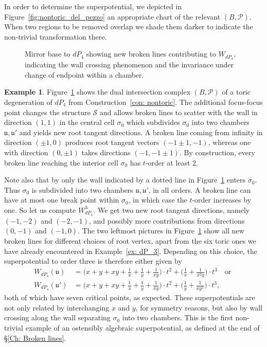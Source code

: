 \documentclass[11pt,letter]{amsart}
\theoremstyle{definition}
\newtheorem{example}[theorem]{Example}
\theoremstyle{remark}
\numberwithin{equation}{section}
\numberwithin{figure}{section}
\newcommand {\fou}  {\mathfrak{u}}
\renewcommand{\P}  {\mathscr{P}}
\newcommand {\scrS}  {\mathscr{S}}
\begin{document}
In order to determine the superpotential, we depicted in
Figure~\ref{fig:nontoric_del_pezzo} an appropriate chart of the relevant
$(B,\P)$. When two regions to be removed overlap we shade them darker to
indicate the non-trivial transformation there.

\begin{figure}

\caption{Mirror base to $dP_4$ showing new broken lines contributing
to $W_{dP_4}$, indicating the wall crossing phenomenon and
the invariance under change of endpoint within a chamber.}
\label{fig:higher_dp4}
\end{figure}

\begin{example}
\label{ex: dP4}
Figure~\ref{fig:higher_dp4} shows the dual intersection complex $(B,\P)$ of a
toric degeneration of $dP_4$ from Construction~\ref{con: nontoric}. The
additional focus-focus point changes the structure $\scrS$ and allows broken
lines to scatter with the wall in direction $(1,1)$ in the central cell
$\sigma_0$ which subdivides $\sigma_0$ into two chambers $\fou,\fou'$ and
yields new root tangent directions. A broken line coming from infinity in
direction $(\pm 1,0)$ produces root tangent vectors $(-1\pm 1,-1)$, whereas
one with direction $(0,\pm 1)$ takes directions $(-1,-1\pm 1)$. By
construction, every broken line reaching the interior cell $\sigma_0$ has
$t$-order at least $2$.

Note also that by \cite[Expl.\,4.3]{Invitation} only the wall indicated by a
dotted line in Figure~\ref{fig:higher_dp4} enters $\sigma_0$. Thus $\sigma_0$ is
subdivided into two chambers $\fou,\fou'$, in all orders. A broken line can have
at most one break point within $\sigma_0$, in which case the $t$-order increases
by one. So let us compute $W_{dP_4}^3$. We get two new root tangent directions,
namely $(-1,-2)$ and $(-2,-1)$, and possibly more contributions from directions
$(0,-1)$ and $(-1,0)$. The two leftmost pictures in Figure~\ref{fig:higher_dp4}
show all new broken lines for different choices of root vertex, apart from the
six toric ones we have already encountered in Example~\ref{ex: dP_3}. Depending
on this choice, the superpotential to order three is therefore either given by 
\begin{align*}
W_{dP_4}(\fou) &=  \Big( x +  y + xy + \frac{1}{x} +
\frac{1}{y} + \frac{1}{xy}\Big) \cdot t^2 +
\Big(\frac{1}{x} + \frac{1}{x^2y}\Big) \cdot t^3 \quad\text{or } \\
W_{dP_4}(\fou') &= \Big(x + y + xy + \frac{1}{x} +
\frac{1}{y} + \frac{1}{xy}\Big) \cdot t^2  +
\Big(\frac{1}{y} + \frac{1}{xy^2}\Big) \cdot t^3 ,
\end{align*}
both of which have seven critical points, as expected. These superpotentials are
not only related by interchanging $x$ and $y$, for symmetry reasons, but also by
wall crossing along the wall separating $\sigma_0$ into two chambers. This is
the first non-trivial example of an ostensibly algebraic superpotential, as
defined at the end of \S\ref{Ch: Broken lines}.


\end{example}
\end{document}
